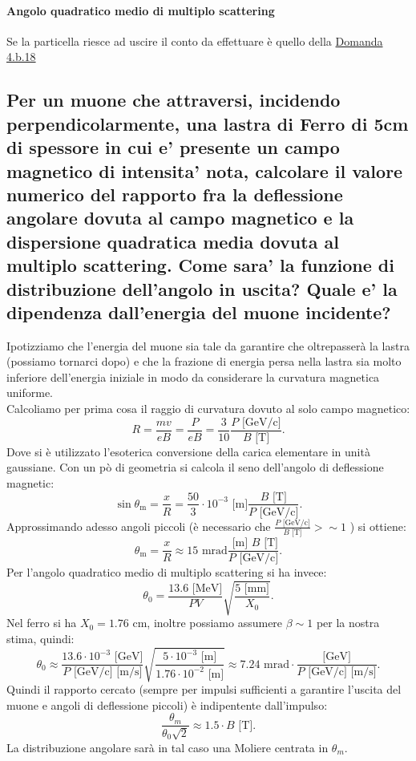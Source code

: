 \paragraph{Angolo quadratico medio di multiplo scattering}%
Se la particella riesce ad uscire il conto da effettuare è quello della \hyperref[sec:4.b.18]{Domanda 4.b.18}

\subsection[\hspace{1mm} Angolo di flessione di un Muone in materiale con campo magnetico ]{Per un muone che attraversi, incidendo perpendicolarmente, una lastra di Ferro di 5cm di spessore in cui e' presente un campo magnetico di intensita' nota, calcolare il valore numerico del rapporto fra la deflessione angolare dovuta al campo magnetico e la dispersione quadratica media dovuta al multiplo scattering. Come sara’ la funzione di distribuzione dell’angolo in uscita? Quale e’ la dipendenza dall’energia del muone incidente?
}
\label{sec:4.b.20}
Ipotizziamo che l'energia del muone sia tale da garantire che oltrepasserà la lastra (possiamo tornarci dopo) e che la frazione di energia persa nella lastra sia molto inferiore dell'energia iniziale in modo da considerare la curvatura magnetica uniforme.\\
Calcoliamo per prima cosa il raggio di curvatura dovuto al solo campo magnetico:
\[
	R= \frac{mv}{eB}= \frac{P}{e B} = \frac{3}{10} \frac{P  \text{ [GeV/c]}}{B \text{ [T]}}
.\] 
Dove si è utilizzato l'esoterica conversione della carica elementare in unità gaussiane. Con un pò di geometria si calcola il seno dell'angolo di deflessione magnetic:
\[
	\sin\theta_{\text{m}}= \frac{x}{R} = \frac{50}{3} \cdot 10^{-3}\text{ [m]}  \frac{B \text{ [T]}}{P  \text{ [GeV/c]}}
.\] 
Approssimando adesso angoli piccoli (è necessario che $ \frac{P \text{ [GeV/c]}}{B \text{ [T]}}>\sim 1$ ) si ottiene:
\[
	\theta_{\text{m}}= \frac{x}{R} \approx 15 \text{ mrad}  \frac{\text{ [m] } B \text{ [T]}}{P  \text{ [GeV/c]}}
.\] 
Per l'angolo quadratico medio di multiplo scattering si ha invece:
\[
	\theta_0= \frac{13.6 \text{ [MeV]}}{PV} \sqrt{ \frac{5 \text{ [mm]}}{X_0}} 
.\] 
Nel ferro si ha $X_0 = 1.76$ cm, inoltre possiamo assumere $\beta \sim 1$ per la nostra stima, quindi:
\[
	\theta_0 \approx \frac{13.6 \cdot 10^{-3} \text{ [GeV]}}{P \text{ [GeV/c] [m/s]}} \sqrt{ \frac{5 \cdot 10^{-3}\text{ [m]} }{1.76 \cdot 10^{-2}\text{ [m]}}}
	\approx 7.24 \text{ mrad} \cdot \frac{\text{[GeV]}}{P\text{ [GeV/c] [m/s]} }
.\] 
Quindi il rapporto cercato (sempre per impulsi sufficienti a garantire l'uscita del muone e angoli di deflessione piccoli) è indipentente dall'impulso:
\[
	\frac{\theta_{m}}{\theta_0 \sqrt{2}} \approx 1.5 \cdot B \text{ [T]}
.\]
La distribuzione angolare sarà in tal caso una Moliere centrata in $\theta_{m}$.

